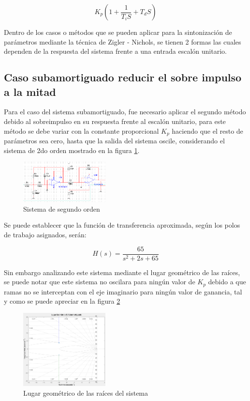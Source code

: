 \documentclass[conference]{IEEEtran}
\begin{document}
	\begin{equation}
		K_p(1 + \frac{1}{T_iS} + T_dS)
		\label{eq:mat-pid}
	\end{equation}
	
	Dentro de los casos o métodos que se pueden aplicar para la sintonización de parámetros mediante la técnica de Zigler - Nichols, se tienen 2 formas las cuales dependen de la respuesta del sistema frente a una entrada escalón unitario.
	
	\subsection{\textbf{Caso subamortiguado reducir el sobre impulso a la mitad}}
	
	Para el caso del sistema subamortiguado, fue necesario aplicar el segundo método debido al sobreimpulso en su respuesta frente al escalón unitario, para este método se debe variar con la constante proporcional $K_p$ haciendo que el resto de parámetros sea cero, hasta que la salida del sistema oscile, considerando el sistema de 2do orden mostrado en la figura \ref{fig:planta-sistema}.
	
	\begin{figure}[h]
		\centering
		\includegraphics[width=0.4\textwidth]{media1/planta-sistema}
		\caption{Sistema de segundo orden}
		\label{fig:planta-sistema}
	\end{figure}
	
	Se puede establecer que la función de transferencia aproximada, según los polos de trabajo asignados, serán:
	
	\begin{equation}
		H(s) = \frac{65}{s^2 + 2s + 65}
		\label{eq:ft-planta}
	\end{equation}
	
	Sin embargo analizando este sistema mediante el lugar geométrico de las raíces, se puede notar que este sistema no oscilara para ningún valor de $K_p$ debido a que ramas no se interceptan con el eje imaginario para ningún valor de ganancia, tal y como se puede apreciar en la figura \ref{fig:lgr-planta}
	
	\begin{figure}[h]
		\centering
		\includegraphics[width=0.4\textwidth]{media/lgr-planta}
		\caption{Lugar geométrico de las raíces del sistema}
		\label{fig:lgr-planta}
	\end{figure}
	
\end{document}

